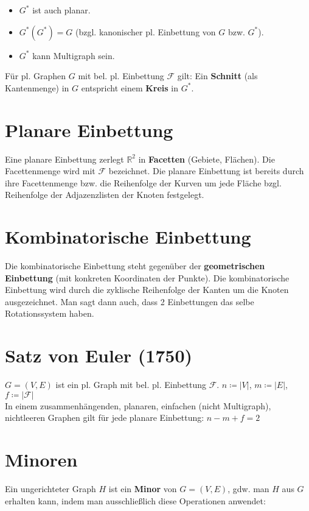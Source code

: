\documentclass[a4paper,11pt]{report}
\begin{document}
\begin{itemize}
    \item $G^*$ ist auch planar.
    \item $G^*(G^*) = G$ (bzgl. kanonischer pl. Einbettung von $G$ bzw. $G^*$).
    \item $G^*$ kann Multigraph sein.
\end{itemize}

Für pl. Graphen $G$ mit bel. pl. Einbettung $\mathcal{F}$ gilt: Ein {\bf Schnitt} (als Kantenmenge) in $G$ entspricht einem {\bf Kreis} in $G^*$.


\section{Planare Einbettung}
Eine planare Einbettung zerlegt $\mathbb{R}^2$ in {\bf Facetten} (Gebiete, Flächen). Die Facettenmenge wird mit $\mathcal{F}$ bezeichnet. Die planare Einbettung ist bereits durch ihre Facettenmenge bzw. die Reihenfolge der Kurven um jede Fläche bzgl. Reihenfolge der Adjazenzlisten der Knoten festgelegt.


\section{Kombinatorische Einbettung}
Die kombinatorische Einbettung steht gegenüber der {\bf geometrischen Einbettung} (mit konkreten Koordinaten der Punkte). Die kombinatorische Einbettung wird durch die zyklische Reihenfolge der Kanten um die Knoten ausgezeichnet. Man sagt dann auch, dass 2 Einbettungen das selbe Rotationssystem haben.


\section{Satz von Euler (1750)}
$G = (V, E)$ ist ein pl. Graph mit bel. pl. Einbettung $\mathcal{F}$. $n \coloneqq |V|$, $m \coloneqq |E|$, $f \coloneqq |\mathcal{F}|$\\

In einem zusammenhängenden, planaren, einfachen (nicht Multigraph), nichtleeren Graphen gilt für jede planare Einbettung: $n - m + f = 2$

\section{Minoren}
Ein ungerichteter Graph $H$ ist ein {\bf Minor} von $G = (V, E)$, gdw. man $H$ aus $G$ erhalten kann, indem man ausschließlich diese Operationen anwendet:
\end{document}
